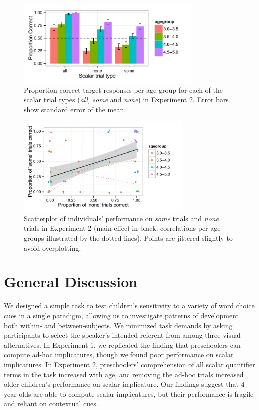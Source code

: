 \documentclass[10pt,letterpaper]{article}
\begin{document}
\begin{figure}[t] 
  \begin{center} 
    \includegraphics[width=3.5in]{figures/implicatures_scalarOnly_clean.pdf} 
    \caption{\label{fig:expt2} Proportion correct target responses per age group for each of the scalar trial types (\emph{all, some} and \emph{none}) in Experiment 2. Error bars show standard error of the mean. }
    \end{center} 
\vspace{-1ex} 
\end{figure}

\begin{figure}[t] 
  \begin{center} 
    \includegraphics[width=3.3in]{figures/implicatures_scalarOnly_scatterplot.pdf} 
    \caption{\label{fig:expt2scatterplot} Scatterplot of individuals' performance on \emph{some} trials and \emph{none} trials in Experiment 2 (main effect in black, correlations per age groups illustrated by the dotted lines). Points are jittered slightly to avoid overplotting. }
    \end{center} 
\vspace{-1ex} 
\end{figure}


 \section{General Discussion} 
 
We designed a simple task to test children's sensitivity to a variety of word choice cues in a single paradigm, allowing us to investigate patterns of development both within- and between-subjects. We minimized task demands by asking participants to select the speaker's intended referent from among three visual alternatives. In Experiment 1, we replicated the finding that preschoolers can compute ad-hoc implicatures, though we found poor performance on scalar implicatures. In Experiment 2, preschoolers' comprehension of all scalar quantifier terms in the task increased with age, and removing the ad-hoc trials increased older children's performance on scalar implicature. Our findings suggest that 4-year-olds are able to compute scalar implicatures, but their performance is fragile and reliant on contextual cues. 
\end{document}
